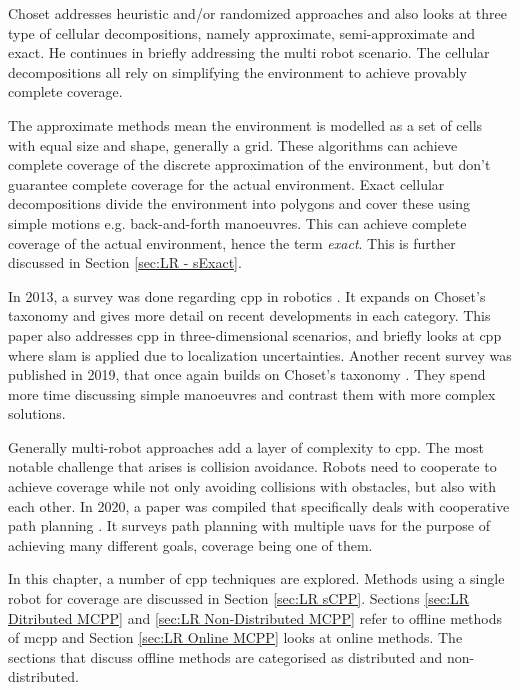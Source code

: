 Choset addresses heuristic and/or randomized approaches and also looks at three type of cellular decompositions, namely approximate, semi-approximate and exact. He continues in briefly addressing the multi robot scenario. The cellular decompositions all rely on simplifying the environment to achieve provably complete coverage. 

The approximate methods mean the environment is modelled as a set of cells with equal size and shape, generally a grid. These algorithms can achieve complete coverage of the discrete approximation of the environment, but don't guarantee complete coverage for the actual environment. Exact cellular decompositions divide the environment into polygons and cover these using simple motions e.g. back-and-forth manoeuvres. This can achieve complete coverage of the actual environment, hence the term \emph{exact}. This is further discussed in Section \ref{sec:LR - sExact}. 

In 2013, a survey was done regarding \ac{cpp} in robotics \cite{CPP-Survey-2013}. It expands on Choset's taxonomy and gives more detail on recent developments in each category. This paper also addresses \ac{cpp} in three-dimensional scenarios, and briefly looks at \ac{cpp} where \ac{slam} is applied due to localization uncertainties. 
Another recent survey was published in 2019, that once again builds on Choset's taxonomy \cite{CPP-Survey-2019}. They spend more time discussing simple manoeuvres and contrast them with more complex solutions.

Generally multi-robot approaches add a layer of complexity to \ac{cpp}. The most notable challenge that arises is collision avoidance. Robots need to cooperate to achieve coverage while not only avoiding collisions with obstacles, but also with each other. In 2020, a paper was compiled that specifically deals with cooperative path planning \cite{Zhang2020}. It surveys path planning with multiple \acp{uav} for the purpose of achieving many different goals, coverage being one of them.


In this chapter, a number of \ac{cpp} techniques are explored. Methods using a single robot for coverage are discussed in Section \ref{sec:LR sCPP}. Sections \ref{sec:LR Ditributed MCPP} and \ref{sec:LR Non-Distributed MCPP} refer to offline methods of \ac{mcpp} and Section \ref{sec:LR Online MCPP} looks at online methods. The sections that discuss offline methods are categorised as distributed and non-distributed.

